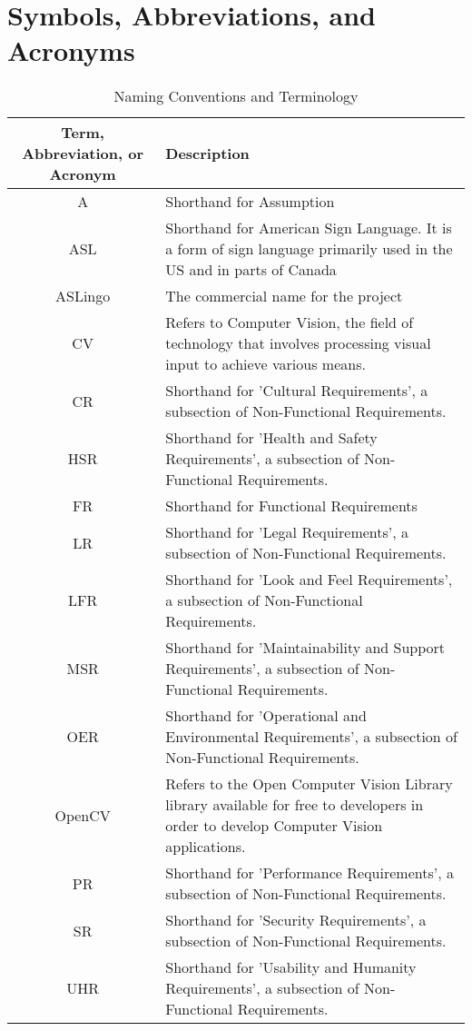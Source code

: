\documentclass[12pt, titlepage]{article}
\begin{document}
\newpage

\tableofcontents

\listoftables

\newpage

\section{Symbols, Abbreviations, and Acronyms}

\begin{longtable}{| c | p{7cm} |}
\caption{Naming Conventions and Terminology} \\
\hline
\textbf{Term, Abbreviation, or Acronym} & \textbf{Description}\\
\hline
A & Shorthand for Assumption\\
\hline
ASL & Shorthand for American Sign Language. It is a form of sign language primarily used in the US and in parts of Canada\\
\hline
ASLingo & The commercial name for the project\\
\hline
CV & Refers to Computer Vision, the field of technology that involves processing visual input to achieve various means.\\
\hline
CR & Shorthand for 'Cultural Requirements', a subsection of Non-Functional Requirements.\\
\hline
HSR & Shorthand for 'Health and Safety Requirements', a subsection of Non-Functional Requirements.\\
\hline
FR & Shorthand for Functional Requirements\\
\hline
LR & Shorthand for 'Legal Requirements', a subsection of Non-Functional Requirements.\\
\hline
LFR & Shorthand for 'Look and Feel Requirements', a subsection of Non-Functional Requirements.\\
\hline
MSR & Shorthand for 'Maintainability and Support Requirements', a subsection of Non-Functional Requirements.\\
\hline
OER & Shorthand for 'Operational and Environmental Requirements', a subsection of Non-Functional Requirements.\\
\hline
OpenCV & Refers to the Open Computer Vision Library library available for free to developers in order to develop Computer Vision applications.\\
\hline
PR & Shorthand for 'Performance Requirements', a subsection of Non-Functional Requirements.\\
\hline
SR & Shorthand for 'Security Requirements', a subsection of Non-Functional Requirements.\\
\hline
UHR & Shorthand for 'Usability and Humanity Requirements', a subsection of Non-Functional Requirements.\\
\bottomrule
\end{longtable}
\end{document}
